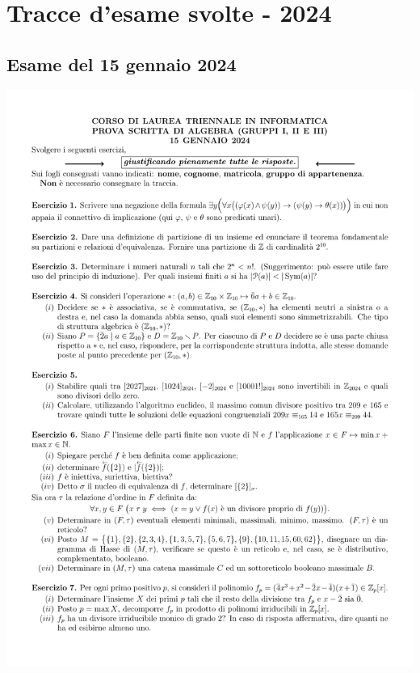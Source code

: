 \chapter{Tracce d'esame svolte - 2024}

\section{Esame del 15 gennaio 2024}
\begin{center}
	\includegraphics[scale=.85]{pdf/24-01-15}
\end{center}

